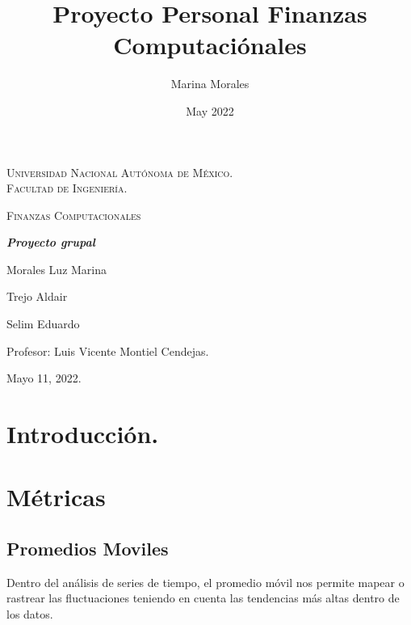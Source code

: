 \documentclass[letter, 12pt]{article}
\title{Proyecto Personal Finanzas Computaciónales}
\author{Marina Morales }
\date{May 2022}
\begin{document}
\begin{titlepage}
    \begin{figure}[htbp]
        \centering
        \hspace{7cm}
        \vspace{0.5cm}
    \end{figure}
     \centering
    	{\scshape\LARGE Universidad Nacional Autónoma de México.\\Facultad de Ingeniería. \par}
    	\vspace{1cm}
    	{\huge \scshape Finanzas Computacionales\par}
    	\vspace{2cm}
    	{\bfseries \Large\textit{Proyecto grupal} \par}
    	\vspace{2cm}
    	{\Large Morales Luz Marina\\ \par}
    	{\Large Trejo Aldair\\ \par}
    	{\Large Selim Eduardo\\ \par}
    	\vfill
    	Profesor: Luis Vicente Montiel Cendejas.\\

    	\vfill

    	{\large Mayo 11, 2022.\\\par}
\end{titlepage}

{\large{\tableofcontents}} %
\cleardoublepage
\onehalfspacing
\section{Introducción.}




\section{Métricas}
\subsection{Promedios Moviles}
Dentro del análisis de series de tiempo, el promedio móvil nos permite mapear o rastrear las fluctuaciones teniendo en cuenta las tendencias más altas dentro de los datos.\\
\end{document}
